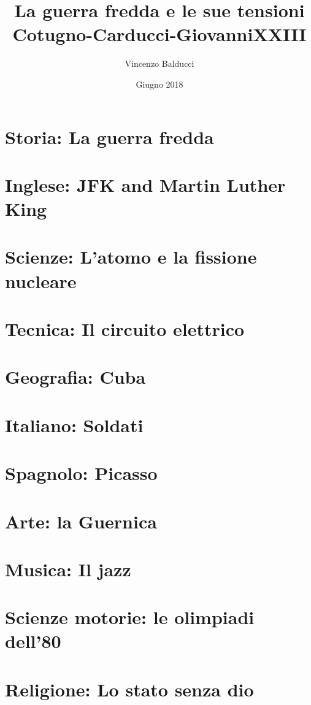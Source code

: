 \documentclass[12pt]{report}
\title{
  {La guerra fredda e le sue tensioni}\\
  {\large Cotugno-Carducci-GiovanniXXIII}
}
\author{Vincenzo Balducci}
\date{Giugno 2018}
\begin{document}
\maketitle

\tableofcontents

\chapter{Storia: La guerra fredda}


\chapter{Inglese: JFK and Martin Luther King}


\chapter{Scienze: L'atomo e la fissione nucleare}


\chapter{Tecnica: Il circuito elettrico}


\chapter{Geografia: Cuba}


\chapter{Italiano: Soldati}



\chapter{Spagnolo: Picasso}


\chapter{Arte: la Guernica}


\chapter{Musica: Il jazz}


\chapter{Scienze motorie: le olimpiadi dell'80}


\chapter{Religione: Lo stato senza dio}

\end{document}
